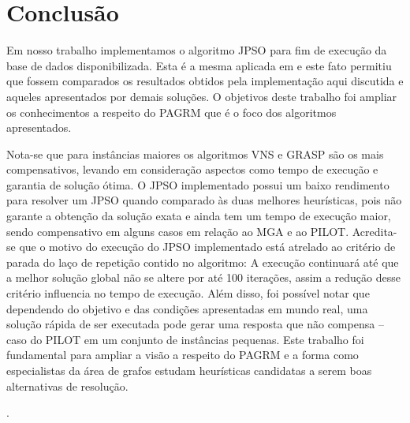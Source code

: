 \documentclass{sig-alternate-05-2015}
\begin{document}
 
\section{Conclusão} \label{sec6}
Em nosso trabalho implementamos o algoritmo JPSO para fim de execução da base de dados disponibilizada. Esta é a mesma aplicada em \cite{consoli2009greedy} e este fato permitiu que fossem comparados os resultados obtidos pela implementação aqui discutida e aqueles apresentados por demais soluções. O objetivos deste trabalho foi ampliar os conhecimentos a respeito do PAGRM que é o foco dos algoritmos apresentados. 

Nota-se que para instâncias maiores os algoritmos VNS e GRASP são os mais compensativos, levando em consideração aspectos como tempo de execução e garantia de solução ótima. O JPSO implementado possui um baixo rendimento para resolver um JPSO quando comparado às duas melhores heurísticas, pois não garante a obtenção da solução exata e ainda tem um tempo de execução maior, sendo compensativo em alguns casos em relação ao MGA e ao PILOT.  Acredita-se que o motivo do execução do JPSO implementado está atrelado ao critério de parada do laço de repetição contido no algoritmo: A execução continuará até que a melhor solução global não se altere por até 100 iterações, assim a redução desse critério influencia no tempo de execução. Além disso, foi possível notar que dependendo do objetivo e das condições apresentadas em mundo real, uma solução rápida de ser executada pode gerar uma resposta que não compensa -- caso do PILOT em um conjunto de instâncias pequenas. Este trabalho foi fundamental para ampliar a visão a respeito do PAGRM e a forma como especialistas da área de grafos estudam heurísticas candidatas a serem boas alternativas de resolução.

.

%

%
%
\end{document}
